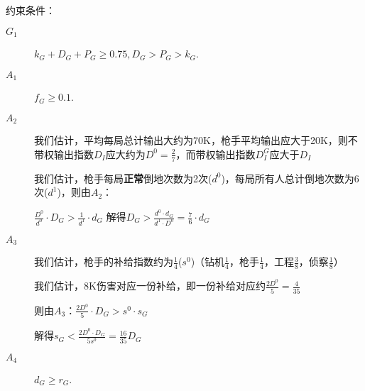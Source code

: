\documentclass{ctexart}
\begin{document}
约束条件：

\begin{description}
    \item[$G_1$] $k_G + D_G + P_G \ge 0.75, D_G > P_G > k_G$.
    \item[$A_1$] $f_G \ge 0.1$.
    \item[$A_2$]  我们估计，平均每局总计输出大约为70K，枪手平均输出应大于20K，则不带权输出指数$D_I$应大约为$D^0 = \frac{2}{7}$，而带权输出指数$D^G_I$应大于$D_I$

          我们估计，枪手每局\textbf{正常}倒地次数为2次($d^0$)，每局所有人总计倒地次数为6次($d^1$)，则由$A_2$：

          $\frac{D^0}{d^0} \cdot D_G> \frac{1}{d^1} \cdot d_G$
          解得$D_G > \frac{d^0 \cdot d_G}{d^1 \cdot D^0} = \frac{7}{6} \cdot d_G$
    \item[$A_3$] 我们估计，枪手的补给指数约为$\frac{1}{4}$($s^0$)（钻机$\frac{1}{4}$，枪手$\frac{1}{4}$，工程$\frac{3}{8}$，侦察$\frac{1}{8}$）

          我们估计，8K伤害对应一份补给，即一份补给对应约$\frac{2D^0}{5} = \frac{4}{35}$

          则由$A_3$：$\frac{2D^0}{5} \cdot D_G > s^0 \cdot s_G$

          解得$s_G < \frac{2D^0 \cdot D_G}{5 s^0} = \frac{16}{35} D_G$

    \item[$A_4$] $d_G \ge r_G$.
\end{description}
\end{document}
